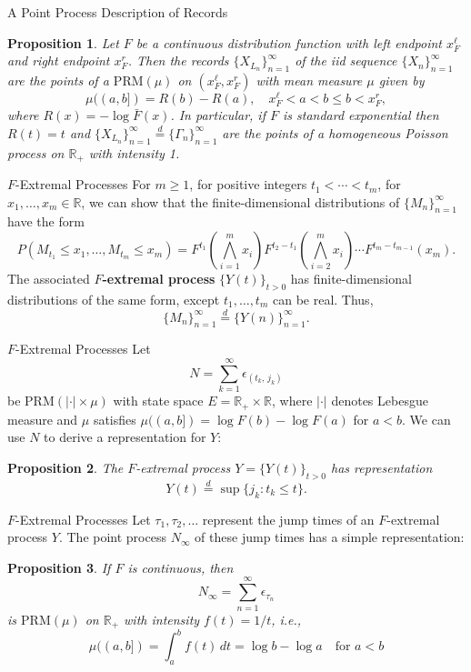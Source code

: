 \documentclass{beamer}
\newcommand{\PRM}{\text{PRM}}
\newtheorem{proposition}{Proposition}
\begin{document}
\begin{frame}{A Point Process Description of Records}
    \begin{proposition}
        Let $F$ be a continuous distribution function with left endpoint $x_F^{\ell}$ and right endpoint $x_F^r$. Then the records $\{X_{L_n}\}_{n = 1}^{\infty}$ of the iid sequence $\{X_n\}_{n = 1}^{\infty}$ are the points of a $\PRM(\mu)$ on $(x_F^{\ell}, x_F^r)$ with mean measure $\mu$ given by
        \[
        \mu((a, b]) = R(b) - R(a), \quad x_F^{\ell} < a < b \le b < x_F^r,
        \]
        where $R(x) = -\log\bar{F}(x)$. In particular, if $F$ is standard exponential then $R(t) = t$ and $\{X_{L_n}\}_{n = 1}^{\infty} \overset{d}{=} \{\Gamma_n\}_{n = 1}^{\infty}$ are the points of a homogeneous Poisson process on $\mathbb{R}_+$ with intensity 1.
    \end{proposition}
\end{frame}

\begin{frame}{$F$-Extremal Processes}
    For $m \ge 1$, for positive integers $t_1 < \cdots < t_m$, for $x_1, \ldots, x_m \in \mathbb{R}$, we can show that the finite-dimensional distributions of $\{M_n\}_{n = 1}^{\infty}$ have the form
    \[
    P(M_{t_1} \le x_1, \ldots, M_{t_m} \le x_m) = F^{t_1}\left(\bigwedge_{i = 1}^m x_i\right)F^{t_2 - t_1}\left(\bigwedge_{i = 2}^m x_i\right) \cdots F^{t_m - t_{m - 1}}\left(x_m\right).
    \]
    The associated \textbf{$F$-extremal process} $\{Y(t)\}_{t > 0}$ has finite-dimensional distributions of the same form, except $t_1, \ldots, t_m$ can be real. Thus,
    \[
    \{M_n\}_{n = 1}^{\infty} \overset{d}{=} \{Y(n)\}_{n = 1}^{\infty}.
    \]
\end{frame}

\begin{frame}{$F$-Extremal Processes}
    Let
    \[
    N = \sum_{k = 1}^{\infty} \epsilon_{(t_k,\,j_k)}
    \]
    be $\PRM(|\cdot| \times \mu)$ with state space $E = \mathbb{R}_+ \times \mathbb{R}$, where $|\cdot|$ denotes Lebesgue measure and $\mu$ satisfies $\mu((a, b]) = \log F(b) - \log F(a)$ for $a < b$. We can use $N$ to derive a representation for $Y$:
    \begin{proposition}
        The $F$-extremal process $Y = \{Y(t)\}_{t > 0}$ has representation
        \[
        Y(t) \overset{d}{=} \sup\{j_k : t_k \le t\}.
        \]
    \end{proposition}
\end{frame}

\begin{frame}{$F$-Extremal Processes}
    Let $\tau_1, \tau_2, \ldots$ represent the jump times of an $F$-extremal process $Y$. The point process $N_{\infty}$ of these jump times has a simple representation:
    \begin{proposition}
        If $F$ is continuous, then
        \[
        N_{\infty} = \sum_{n = 1}^{\infty} \epsilon_{\tau_n}
        \]
        is $\PRM(\mu)$ on $\mathbb{R}_+$ with intensity $f(t) = 1 / t$, i.e.,
        \[
        \mu((a, b]) = \int_a^b f(t)\,dt = \log b - \log a \quad \text{for $a < b$}
        \]
    \end{proposition}
\end{frame}
\end{document}

